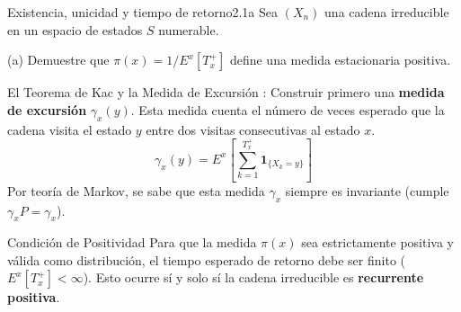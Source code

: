 \documentclass[10pt,a4paper]{article}
\begin{document}
\begin{ejercicio}{Existencia, unicidad y tiempo de retorno}{2.1a}
    Sea $(X_n)$ una cadena irreducible en un espacio de estados $S$ numerable.
\end{ejercicio}

\vspace{2mm}

(a) Demuestre que $\pi(x) = 1/E^x[T_x^+]$ define una medida estacionaria positiva.

\vspace{2mm}

\begin{mytheo}{El Teorema de Kac y la Medida de Excursión : }
      Construir primero una \textbf{medida de excursión} $\gamma_x(y)$. Esta medida cuenta el número de veces esperado que la cadena visita el estado $y$ entre dos visitas consecutivas al estado $x$.
    \[ \gamma_x(y) = E^x \left[ \sum_{k=1}^{T_x^+} \mathbf{1}_{\{X_k = y\}} \right] \]
    Por teoría de Markov, se sabe que esta medida $\gamma_x$ siempre es invariante (cumple $\gamma_x P = \gamma_x$).
\end{mytheo}

\begin{alerta}{Condición de Positividad}
    Para que la medida $\pi(x)$ sea estrictamente positiva y válida como distribución, el tiempo esperado de retorno debe ser finito ($E^x[T_x^+] < \infty$). Esto ocurre sí y solo sí la cadena irreducible es \textbf{recurrente positiva}.
\end{alerta}

\vspace{5mm}
\end{document}
